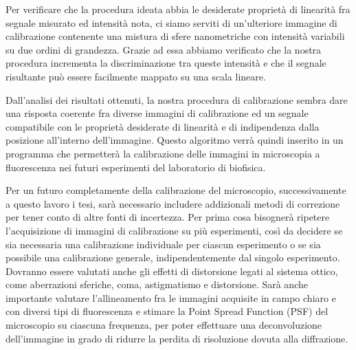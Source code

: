 Per verificare che la procedura ideata abbia le desiderate proprietà di linearità fra segnale misurato ed intensità nota, ci siamo serviti di un'ulteriore immagine di calibrazione contenente una mistura di sfere nanometriche con intensità variabili su due ordini di grandezza.
Grazie ad essa abbiamo verificato che la nostra procedura incrementa la discriminazione tra queste intensità e che il segnale risultante può essere facilmente mappato su una scala lineare. 

Dall'analisi dei risultati ottenuti, la nostra procedura di calibrazione sembra dare una risposta coerente fra diverse immagini di calibrazione ed un segnale compatibile con le proprietà desiderate di linearità e di indipendenza dalla posizione all'interno dell'immagine. 
Questo algoritmo verrà quindi inserito in un programma che permetterà la calibrazione delle immagini in microscopia a fluorescenza nei futuri esperimenti del laboratorio di biofisica.

Per un futuro completamente della calibrazione del microscopio, successivamente a questo lavoro i tesi, sarà necessario includere addizionali metodi di correzione per tener conto di altre fonti di incertezza.
Per prima cosa bisognerà ripetere l'acquisizione di immagini di calibrazione su più esperimenti, così da decidere se sia necessaria una calibrazione individuale per ciascun esperimento o se sia possibile una calibrazione generale, indipendentemente dal singolo esperimento.
Dovranno essere valutati anche gli effetti di distorsione legati al sistema ottico, come aberrazioni sferiche, coma, astigmatismo e distorsione.
Sarà anche importante valutare l'allineamento fra le immagini acquisite in campo chiaro e con diversi tipi di fluorescenza e stimare la Point Spread Function (PSF) del microscopio su ciascuna frequenza, per poter effettuare una deconvoluzione dell'immagine in grado di ridurre la perdita di risoluzione dovuta alla diffrazione.
